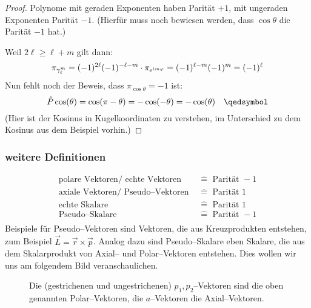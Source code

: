 \documentclass[Ex4_Zusammenfassung.tex]{subfiles}
\begin{document}
\begin{proof}
	Polynome mit geraden Exponenten haben Parität $+1$, mit ungeraden Exponenten Parität $-1$. (Hierfür muss noch bewiesen werden, dass $\cos \theta $ die Parität $-1$ hat.)
	
	Weil $2\ell \geq \ell + m$ gilt dann:
	\begin{equation}
		\pi_{\gamma_\ell^m} = (-1)^{2\ell} (-1)^{-\ell - m} \cdot \pi_{\mathrm{e}^{im\varphi}} = (-1)^{\ell -m} (-1)^m = (-1)^\ell \qedhere
	\end{equation}
	Nun fehlt noch der Beweis, dass $\pi_{\cos \theta}=-1$ ist:
	\begin{equation}
		\hat{P} \cos (\theta) = \cos (\pi - \theta) = - \cos(-\theta) = -\cos(\theta) \quad \qedsymbol
	\end{equation}
	(Hier ist der Kosinus in Kugelkoordinaten zu verstehen, im Unterschied zu dem Kosinus aus dem Beispiel vorhin.)
\end{proof}

\subsubsection*{weitere Definitionen}
\begin{align*}
	\text{polare Vektoren/ echte Vektoren } &\hat{=} \text{ Parität } -1\\
	\text{axiale Vektoren/ Pseudo--Vektoren } &\hat{=} \text{ Parität } 1\\
	\text{echte Skalare } &\hat{=} \text{ Parität } 1\\
	\text{Pseudo--Skalare } &\hat{=} \text{ Parität } -1\\
\end{align*}
Beispiele für Pseudo--Vektoren sind Vektoren, die aus Kreuzprodukten entstehen, zum Beispiel $\vec{L} = \vec{r} \times \vec{p}$. Analog dazu sind Pseudo--Skalare eben Skalare, die aus dem Skalarprodukt von Axial-- und Polar--Vektoren entstehen. Dies wollen wir uns am folgendem Bild veranschaulichen.

\begin{figure}[H]
	\centering
	\caption{Die (gestrichenen und ungestrichenen) $p_1, p_2$--Vektoren sind die oben genannten Polar--Vektoren, die $a$--Vektoren die Axial--Vektoren.}
\end{figure}
\end{document}
